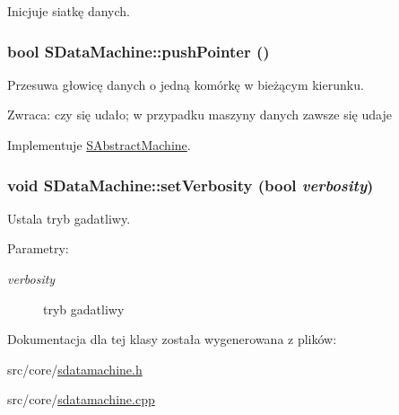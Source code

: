 Inicjuje siatkę danych. \hypertarget{classSDataMachine_10eb8f56cf6235455a26c5c673b8fe15}{
\subsubsection[{pushPointer}]{\setlength{\rightskip}{0pt plus 5cm}bool SDataMachine::pushPointer ()}}
\label{classSDataMachine_10eb8f56cf6235455a26c5c673b8fe15}


Przesuwa głowicę danych o jedną komórkę w bieżącym kierunku. \begin{Desc}
\item[Zwraca:]czy się udało; w przypadku maszyny danych zawsze się udaje \end{Desc}


Implementuje \hyperlink{classSAbstractMachine_72a47b72416e0d2f24fcf36415d37404}{SAbstractMachine}.\hypertarget{classSDataMachine_38cc38f27606be24fc609d461d25ae2f}{
\subsubsection[{setVerbosity}]{\setlength{\rightskip}{0pt plus 5cm}void SDataMachine::setVerbosity (bool {\em verbosity})}}
\label{classSDataMachine_38cc38f27606be24fc609d461d25ae2f}


Ustala tryb gadatliwy. \begin{Desc}
\item[Parametry:]
\begin{description}
\item[{\em verbosity}]tryb gadatliwy \end{description}
\end{Desc}


Dokumentacja dla tej klasy została wygenerowana z plików:\begin{CompactItemize}
\item 
src/core/\hyperlink{sdatamachine_8h}{sdatamachine.h}\item 
src/core/\hyperlink{sdatamachine_8cpp}{sdatamachine.cpp}\end{CompactItemize}

